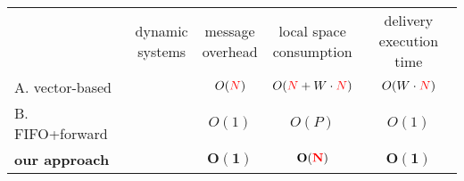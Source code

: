 \small
\begin{tabularx}{0.98\columnwidth}{@{}Xcccc@{}}
  & \makecell{dynamic\\systems} & \makecell{message\\overhead} & \makecell{local space\\consumption} &  \makecell{delivery\\execution time} \\ \cmidrule{2-5}
  A. vector-based & \YES{\cmark} & $O(\textcolor{red}{N})$ & $O(\textcolor{red}{N}+W\cdot\textcolor{red}{N})$ & $O(W\cdot\textcolor{red}{N})$ \\
  B. FIFO+forward & \NO{\xmark} & $O(1)$ & $O(P)$ & $O(1)$ \\ \hline\hline
  \textbf{our approach} & \textbf{\YES{\cmark}} & $\mathbf{O(1)}$ & $\mathbf{O(\textcolor{red}{N})}$ & $\mathbf{O(1)}$ \\ 
\end{tabularx}

